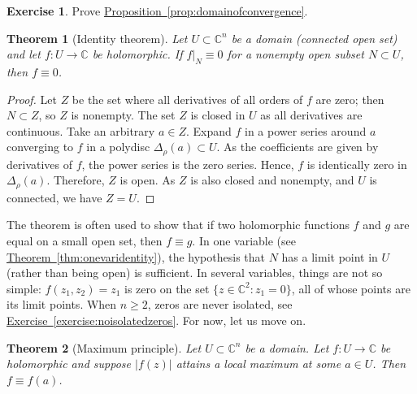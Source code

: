\documentclass[12pt,openany]{book}
\newcommand{\sabs}[1]{\lvert {#1} \rvert}
\newcommand{\C}{{\mathbb{C}}}
\theoremstyle{plain}
\newtheorem{thm}{Theorem}[section]
\theoremstyle{remark}
\theoremstyle{definition}
\newenvironment{exbox}{%
    \def\FrameCommand{\vrule width 1pt \relax\hspace{10pt}}%
    \MakeFramed{\advance\hsize-\width\FrameRestore}%
}{%
    \endMakeFramed
}
\theoremstyle{exercise}
\newtheorem{exercise}{Exercise}[section]
\theoremstyle{example}
\newcommand{\exerciseref}[1]{\hyperref[#1]{Exercise~\ref*{#1}}}
\newcommand{\thmref}[1]{\hyperref[#1]{Theorem~\ref*{#1}}}
\newcommand{\propref}[1]{\hyperref[#1]{Proposition~\ref*{#1}}}
\begin{document}
\begin{exbox}
\begin{exercise}
Prove \propref{prop:domainofconvergence}.
\end{exercise}
\end{exbox}

\begin{thm}[Identity theorem]\label{thm:identity}
\pagebreak[2]
Let $U \subset \C^n$ be a domain (connected open set) and let
$f \colon U \to \C$ be holomorphic.
If $f|_N \equiv 0$ for a nonempty open subset $N \subset U$,
then $f \equiv 0$.
\end{thm}

\begin{proof}
Let $Z$ be the set where all derivatives of all orders of $f$ are zero; then
$N \subset Z$, so $Z$ is nonempty.  The set $Z$ is closed in $U$
as all derivatives are continuous.
Take an arbitrary $a \in Z$.
Expand $f$
in a power series around $a$ converging to $f$ in a polydisc
$\Delta_\rho(a) \subset U$.
As the coefficients are given by derivatives
of $f$, the power series is the zero series.  Hence, $f$ is
identically zero in $\Delta_\rho(a)$.  Therefore, $Z$ is open.
As $Z$ is also closed and nonempty, and $U$ is connected,
we have $Z = U$.
\end{proof}

The theorem is often used to show that
if two holomorphic functions $f$ and $g$
are equal on a small open set,
then $f \equiv g$.  In one variable (see \thmref{thm:onevaridentity}),
the hypothesis that $N$ has a limit point in $U$ (rather than being open)
is sufficient.  In several
variables, things are not so simple: $f(z_1,z_2) = z_1$ is zero on the set
$\{ z \in \C^2 : z_1=0 \}$, all of whose points are its limit points.
When $n \geq 2$, zeros are never isolated,
see \exerciseref{exercise:noisolatedzeros}.
For now, let us move on.

\begin{thm}[Maximum principle]
Let $U \subset \C^n$ be a domain.
Let $f \colon U \to \C$ be holomorphic and suppose $\sabs{f(z)}$
attains a local maximum at some $a \in U$.  Then $f \equiv f(a)$.
\end{thm}
\end{document}

